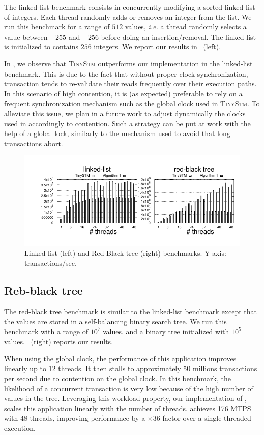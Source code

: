 The linked-list benchmark consists in concurrently modifying a sorted linked-list of integers. 
Each thread randomly adds or removes an integer from the list. 
We run this benchmark for a range of $512$ values, \emph{i.e.} a thread randomly selects a value between $-255$ and $+256$ before doing an insertion/removal.
The linked list is initialized to contains $256$ integers.
We report our results in ~(left).

In , we observe that \textsc{TinyStm} outperforms our implementation in the linked-list benchmark.
This is due to the fact that without proper clock synchronization, transaction tends to re-validate their reads frequently over their execution paths.
In this scenario of high contention, it is (as expected) preferable to rely on a frequent synchronization mechanism such as the global clock used in \textsc{TinyStm}.
To alleviate this issue, we plan in a future work to adjust dynamically the clocks used in  accordingly to contention.
Such a strategy can be put at work with the help of a global lock, similarly to the mechanism used to avoid that long transactions abort.

\begin{figure}[!t]
  \centering
  \includegraphics[scale = 1.0]{results/intset/ll-rb.pdf}
  \caption{Linked-list (left) and Red-Black tree (right) benchmarks. Y-axis: transactions/sec. }
\end{figure}

\subsection{Reb-black tree}

The red-black tree benchmark is similar to the linked-list benchmark except that the values are stored in a self-balancing binary search tree. 
We run this benchmark with a range of $10^7$ values, and a binary tree initialized with $10^5$ values.
~(right) reports our results.

When using the global clock, the performance of this application improves linearly up to 12 threads. 
It then stalls to approximately 50 millions transactions per second due to contention on the global clock.
In this benchmark, the likelihood of a concurrent transaction is very low because of the high number of values in the tree.
Leveraging this workload property, our implementation of , scales this application linearly with the number of threads.
 achieves 176 MTPS with 48 threads, improving performance by a $\times 36$ factor over a single threaded execution.


